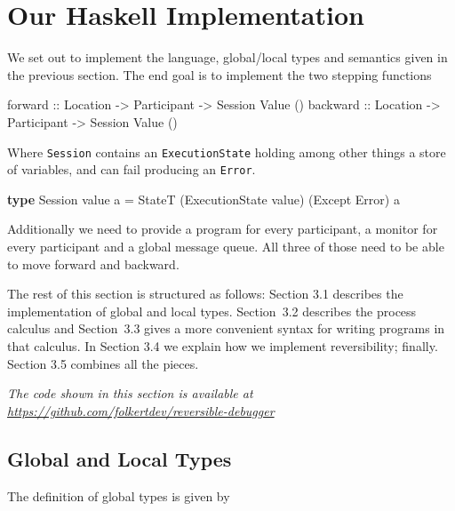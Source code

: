 \documentclass[runningheads]{llncs}
\newenvironment{Shaded}{}{}
\newcommand{\KeywordTok}[1]{\textcolor[rgb]{0.00,0.44,0.13}{\textbf{#1}}}
\newcommand{\DataTypeTok}[1]{\textcolor[rgb]{0.56,0.13,0.00}{#1}}
\newcommand{\OtherTok}[1]{\textcolor[rgb]{0.00,0.44,0.13}{#1}}
\newcommand{\FunctionTok}[1]{\textcolor[rgb]{0.02,0.16,0.49}{#1}}
\newcommand{\NormalTok}[1]{#1}
\begin{document}
\section{Our Haskell Implementation}\label{our-haskell-implementation}

We set out to implement the language, global/local types and semantics given in the previous section.
The end goal is to implement the two stepping functions

\begin{Shaded}
\begin{Highlighting}[]
\OtherTok{forward ::} \DataTypeTok{Location} \OtherTok{->} \DataTypeTok{Participant} \OtherTok{->} \DataTypeTok{Session} \DataTypeTok{Value}\NormalTok{ ()}
\OtherTok{backward ::} \DataTypeTok{Location} \OtherTok{->} \DataTypeTok{Participant} \OtherTok{->} \DataTypeTok{Session} \DataTypeTok{Value}\NormalTok{ ()}
\end{Highlighting}
\end{Shaded}

Where \texttt{Session} contains an \texttt{ExecutionState} holding among
other things a store of variables, and can fail producing an
\texttt{Error}.

\begin{Shaded}
\begin{Highlighting}[]
\KeywordTok{type} \DataTypeTok{Session}\NormalTok{ value a }\FunctionTok{=} 
    \DataTypeTok{StateT}\NormalTok{ (}\DataTypeTok{ExecutionState}\NormalTok{ value) (}\DataTypeTok{Except} \DataTypeTok{Error}\NormalTok{) a}
\end{Highlighting}
\end{Shaded}

Additionally we need to provide a program for every participant, a
monitor for every participant and a global message queue. All three of
those need to be able to move forward and backward.

The rest of this section is structured as follows: Section 3.1 describes
the implementation of global and local types.
Section~3.2 describes the process calculus and Section~3.3 gives a more convenient syntax for writing programs in
that calculus. 
In Section 3.4 we explain how we implement reversibility; finally. 
Section 3.5 combines all the pieces.

\emph{The code shown in this section is available at
\url{https://github.com/folkertdev/reversible-debugger}}

\subsection{Global and Local Types}\label{global-and-local-types}
The definition of global types is given by
\end{document}
